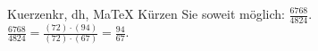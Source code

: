 \begin{MAufgabe}{Kuerzen}{kr, dh, MaTeX}
K\"urzen Sie soweit m\"oglich: $\frac{6768}{4824}$.\\ 
\ifLsg\MLoesung
\quad $\frac{6768}{4824}=\frac{(72)\cdot(94)}{(72)\cdot(67)}=\frac{94}{67}$.\else\relax\fi
 \end{MAufgabe}